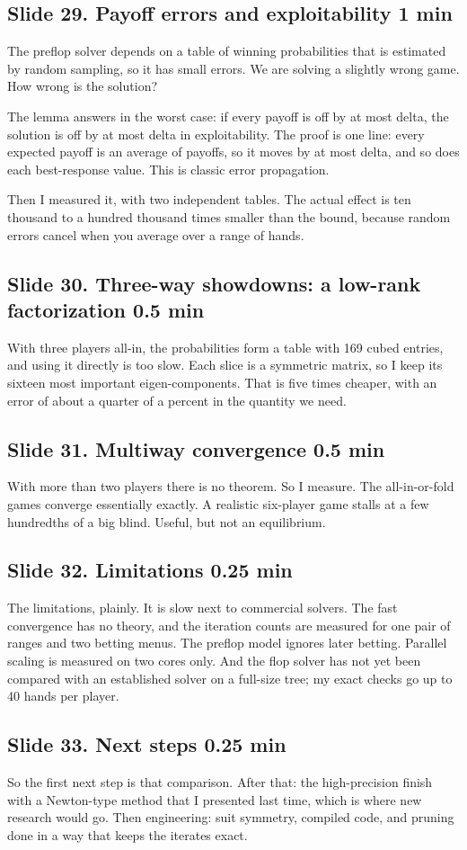 \documentclass[11pt]{article}
\newcommand{\slidehead}[3]{\subsection*{Slide #1. #2 \hfill {\normalfont\small #3}}}
\begin{document}
\slidehead{29}{Payoff errors and exploitability}{1 min}
\begin{say}
The preflop solver depends on a table of winning probabilities that is estimated by random sampling, so it has
small errors. We are solving a slightly wrong game. How wrong is the solution?

The lemma answers in the worst case: if every payoff is off by at most delta, the solution is off by at most
delta in exploitability. The proof is one line: every expected payoff is an average of payoffs, so it moves by at
most delta, and so does each best-response value. This is classic error propagation.

Then I measured it, with two independent tables. The actual effect is ten thousand to a hundred thousand times
smaller than the bound, because random errors cancel when you average over a range of hands.
\end{say}

\slidehead{30}{Three-way showdowns: a low-rank factorization}{0.5 min}
\begin{say}
With three players all-in, the probabilities form a table with 169 cubed entries, and using it directly is too slow.
Each slice is a symmetric matrix, so I keep its sixteen most important eigen-components. That is five times cheaper,
with an error of about a quarter of a percent in the quantity we need.
\end{say}

\slidehead{31}{Multiway convergence}{0.5 min}
\begin{say}
With more than two players there is no theorem. So I measure. The all-in-or-fold games converge essentially
exactly. A realistic six-player game stalls at a few hundredths of a big blind. Useful, but not an equilibrium.
\end{say}

\slidehead{32}{Limitations}{0.25 min}
\begin{say}
The limitations, plainly. It is slow next to commercial solvers. The fast convergence has no theory, and the
iteration counts are measured for one pair of ranges and two betting menus. The preflop
model ignores later betting. Parallel scaling is measured on two cores only. And the flop solver has not yet been
compared with an established solver on a full-size tree; my exact checks go up to 40 hands per player.
\end{say}

\slidehead{33}{Next steps}{0.25 min}
\begin{say}
So the first next step is that comparison. After that: the high-precision finish with a Newton-type method that I
presented last time, which is where new research would go. Then engineering: suit symmetry, compiled code, and
pruning done in a way that keeps the iterates exact.
\end{say}
\end{document}
